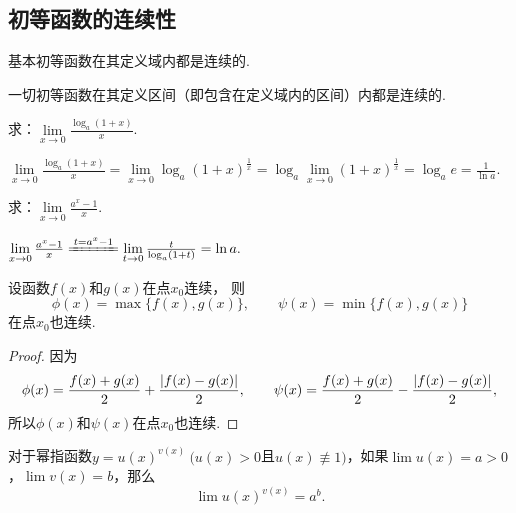 \subsection{初等函数的连续性}
\begin{theorem}\label{theorem:极限.连续函数的极限5}
基本初等函数在其定义域内都是连续的.
\end{theorem}

\begin{corollary}\label{theorem:极限.连续函数的极限6}
一切初等函数在其定义区间（即包含在定义域内的区间）内都是连续的.
\end{corollary}

\begin{example}
求：\(\lim\limits_{x\to0}\frac{\log_a (1+x)}{x}\).
\begin{solution}
\(
\lim\limits_{x\to0}\frac{\log_a (1+x)}{x}
= \lim\limits_{x\to0}\log_a (1+x)^{\frac{1}{x}}
= \log_a \lim\limits_{x\to0}(1+x)^{\frac{1}{x}}
= \log_a e
= \frac{1}{\ln a}.
\)
\end{solution}
\end{example}

\begin{example}
求：\(\lim\limits_{x\to0}\frac{a^x - 1}{x}\).
\begin{solution}
\(
\lim\limits_{x\to0}\frac{a^x - 1}{x}
\xlongequal{t=a^x-1} \lim\limits_{t\to0}\frac{t}{\log_a (1+t)}
= \ln a.
\)
\end{solution}
\end{example}

\begin{proposition}
设函数\(f(x)\)和\(g(x)\)在点\(x_0\)连续，
则\[
	\phi(x)=\max\{f(x),g(x)\}, \qquad
	\psi(x)=\min\{f(x),g(x)\}
\]在点\(x_0\)也连续.
\begin{proof}
因为\[
	\phi(x)=\frac{f(x)+g(x)}{2}+\frac{\abs{f(x)-g(x)}}{2}, \qquad
	\psi(x)=\frac{f(x)+g(x)}{2}-\frac{\abs{f(x)-g(x)}}{2},
\]
所以\(\phi(x)\)和\(\psi(x)\)在点\(x_0\)也连续.
\end{proof}
\end{proposition}

\begin{theorem}\label{theorem:极限.连续函数的极限7}
对于幂指函数\(y = u(x)^{v(x)}\ (u(x) > 0\)且\(u(x) \not\equiv 1)\)，如果\(\lim u(x) = a > 0\)，\(\lim v(x) = b\)，那么\[
\lim u(x)^{v(x)} = a^b.
\]
\end{theorem}

